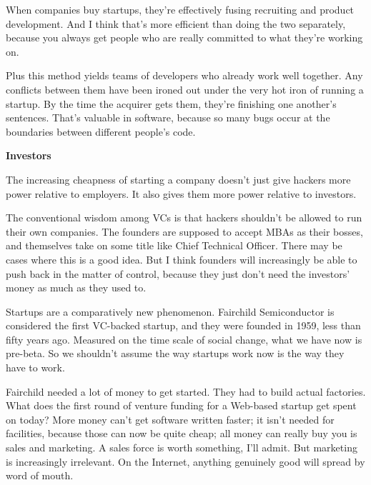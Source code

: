 When
                    companies buy startups, they're effectively fusing
                    recruiting and product development. And I think that's more
                    efficient than doing the two separately, because you always
                    get people who are really committed to what they're working
                    on.

Plus this method yields teams of developers
                    who already work well together. Any conflicts between them
                    have been ironed out under the very hot iron of running a
                    startup. By the time the acquirer gets them, they're
                    finishing one another's sentences. That's valuable in
                    software, because so many bugs occur at the boundaries
                    between different people's code.

\textbf{Investors}

The increasing cheapness of starting a company
                    doesn't just give hackers more power relative to employers.
                    It also gives them more power relative to investors.

The
                    conventional wisdom among VCs is that hackers shouldn't be
                    allowed to run their own companies. The founders are
                    supposed to accept MBAs as their bosses, and themselves take
                    on some title like Chief Technical Officer. There may be
                    cases where this is a good idea. But I think founders will
                    increasingly be able to push back in the matter of control,
                    because they just don't need the investors' money as much as
                    they used to.

Startups are a comparatively new
                    phenomenon. Fairchild Semiconductor is considered the first
                    VC-backed startup, and they were founded in 1959, less than
                    fifty years ago. Measured on the time scale of social
                    change, what we have now is pre-beta. So we shouldn't assume
                    the way startups work now is the way they have to work.

Fairchild
                    needed a lot of money to get started. They had to build
                    actual factories. What does the first round of venture
                    funding for a Web-based startup get spent on today? More
                    money can't get software written faster; it isn't needed for
                    facilities, because those can now be quite cheap; all money
                    can really buy you is sales and marketing. A sales force is
                    worth something, I'll admit. But marketing is increasingly
                    irrelevant. On the Internet, anything genuinely good will
                    spread by word of mouth.


